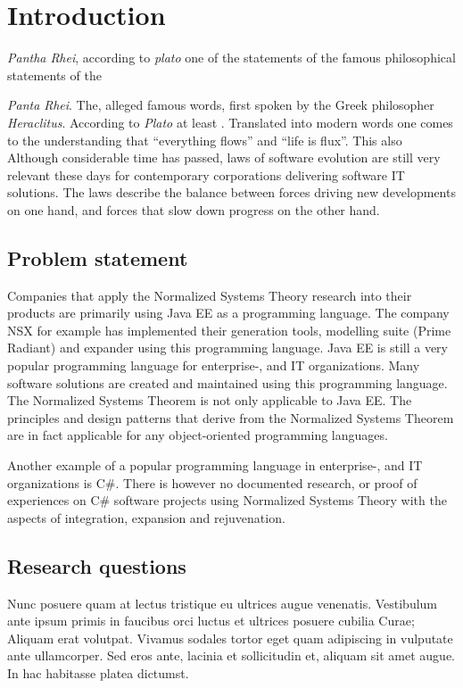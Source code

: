 \chapter{Introduction} \label{introduction}


\emph{Pantha Rhei}, according to \emph{plato} one of the statements of the famous philosophical statements of the 


\emph{Panta Rhei}. The, alleged famous words, first spoken by the Greek philosopher
\emph{Heraclitus}. According to \emph{Plato} at least
. Translated into
modern words one comes to the understanding that \enquote{everything flows} and
\enquote{life is flux}.
This also 
Although considerable time has passed, \citeauthor{lehman_programs_1980} laws of software
evolution \cite{lehman_programs_1980} are still very relevant these days for contemporary
corporations delivering software IT solutions. The laws describe the balance between
forces driving new developments on one hand, and forces that slow down progress on the
other hand. 




\section{Problem statement} \label{problem_statement}
Companies that apply the Normalized Systems Theory research into their products are
primarily using Java EE as a programming language. The company NSX for example has
implemented their generation tools, modelling suite (Prime Radiant) and expander using
this programming language. Java EE is still a very popular programming language for
enterprise-, and IT organizations. Many software solutions are created and maintained
using this programming language. The Normalized Systems Theorem is not only applicable to
Java EE. The principles and design patterns that derive from the Normalized Systems
Theorem are in fact applicable for any object-oriented programming languages. 

Another example of a popular programming language in enterprise-, and IT organizations is
C\#. There is however no documented research, or proof of experiences on C\# software
projects using Normalized Systems Theory with the aspects of integration, expansion and
rejuvenation.





\section{Research questions} \label{ResearchQuestions}

Nunc posuere quam at lectus tristique eu ultrices augue venenatis. Vestibulum ante ipsum
primis in faucibus orci luctus et ultrices posuere cubilia Curae; Aliquam erat volutpat.
Vivamus sodales tortor eget quam adipiscing in vulputate ante ullamcorper. Sed eros ante,
lacinia et sollicitudin et, aliquam sit amet augue. In hac habitasse platea dictumst.